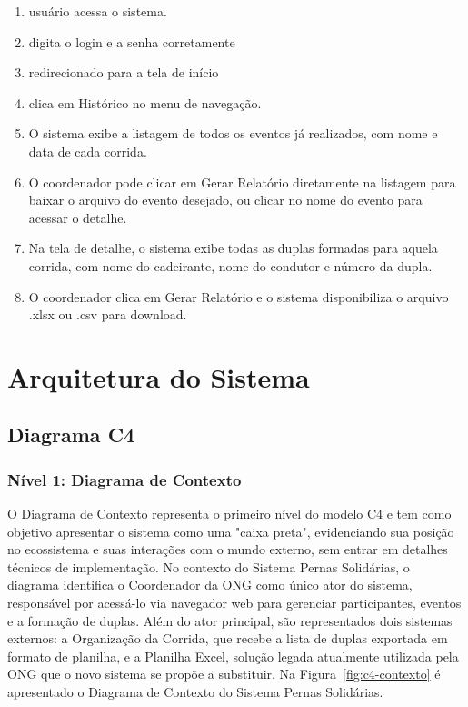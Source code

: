 \documentclass[12pt,a4paper]{article}
\begin{document}
\begin{enumerate}
    \item usuário acessa o sistema.
    \item digita o login e a senha corretamente
    \item redirecionado para a tela de início
    \item clica em Histórico no menu de navegação.
    \item O sistema exibe a listagem de todos os eventos já realizados,
    com nome e data de cada corrida.
    \item O coordenador pode clicar em Gerar Relatório diretamente na listagem para baixar o arquivo do evento desejado, ou clicar no nome do evento para acessar o detalhe.
    \item Na tela de detalhe, o sistema exibe todas as duplas formadas para aquela corrida, com nome do cadeirante, nome do condutor e número da dupla.
    \item O coordenador clica em Gerar Relatório e o sistema disponibiliza o arquivo .xlsx ou .csv para download.
\end{enumerate}

\FloatBarrier

\section{Arquitetura do Sistema}

\subsection{Diagrama C4}

\subsubsection{Nível 1: Diagrama de Contexto}

O Diagrama de Contexto representa o primeiro nível do modelo C4 e tem como objetivo apresentar o sistema como uma "caixa preta", evidenciando sua posição no ecossistema e suas interações com o mundo externo, sem entrar em detalhes técnicos de implementação. No contexto do Sistema Pernas Solidárias, o diagrama identifica o Coordenador da ONG como único ator do sistema, responsável por acessá-lo via navegador web para gerenciar participantes, eventos e a formação de duplas. Além do ator principal, são representados dois sistemas externos: a Organização da Corrida, que recebe a lista de duplas exportada em formato de planilha, e a Planilha Excel, solução legada atualmente utilizada pela ONG que o novo sistema se propõe a substituir. Na Figura~\ref{fig:c4-contexto} é apresentado o Diagrama de Contexto
do Sistema Pernas Solidárias.
\end{document}
